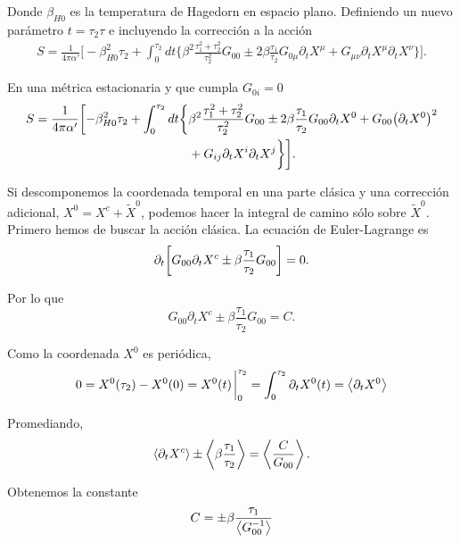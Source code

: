 Donde $\beta_{H0}$ es la temperatura de Hagedorn en espacio plano.
Definiendo un nuevo parámetro $t=\tau_2 \tau$ e incluyendo la corrección a la acción
\begin{equation}
  \begin{aligned}
    S=\frac{1}{4\pi\alpha'}\biggl[ -\beta_{H0}^2\tau_2 + \int_0^{\tau_2} dt \biggl\{
      \beta^2 \frac{\tau_1^2+\tau_2^2}{\tau_2^2}G_{00} \pm 2\beta\frac{\tau_1}{\tau_2} G_{0\mu}\partial_t X^\mu  +G_{\mu\nu} \partial_t X^\mu \partial_t X^\nu
    \biggl\}\biggl].
  \end{aligned}
\end{equation}

En una métrica estacionaria y que cumpla $G_{0i}=0$
\begin{equation}
  \begin{aligned}
    S=\frac{1}{4\pi\alpha'}\biggl[ -\beta_{H0}^2\tau_2 + \int_0^{\tau_2} dt \biggl\{&
      \beta^2 \frac{\tau_1^2+\tau_2^2}{\tau_2^2}G_{00} \pm 2\beta\frac{\tau_1}{\tau_2} G_{00}\partial_t X^0  +G_{00} \qty(\partial_t X^0)^2 \\
    &+G_{ij} \partial_t X^i \partial_t X^j
    \biggl\}\biggl].
  \end{aligned}
\end{equation}

Si descomponemos la coordenada temporal en una parte clásica y una corrección adicional,
$X^0=X^{c}+\tilde X^0$, podemos hacer la integral de camino sólo sobre $\tilde X^0$. 
Primero hemos de buscar la acción clásica.
La ecuación de Euler-Lagrange es 
\begin{equation}
  \partial_t\qty[G_{00}\partial_t X^c \pm \beta \frac{\tau_1}{\tau_2}G_{00}]=0.
\end{equation}

Por lo que 
\begin{equation}
  G_{00}\partial_t X^c \pm \beta \frac{\tau_1}{\tau_2}G_{00}=C.
\end{equation}

Como la coordenada $X^0$ es periódica,
\begin{equation}
  0=X^0(\tau_2) -X^0(0) = X^0(t)\eval_0^{\tau_2}= \int_0^{\tau_2}\partial_t X^0(t) = \ev{\partial_t X^0} 
\end{equation}

Promediando,
\begin{equation}
  \ev{\partial_t X^c} \pm \ev{\beta \frac{\tau_1}{\tau_2}}=\ev{\frac{C}{G_{00}}} .
\end{equation}

Obtenemos la constante
\begin{equation}
  C = \pm \beta \frac{\tau_1}{\ev{G_{00}^{-1}}}
\end{equation}

